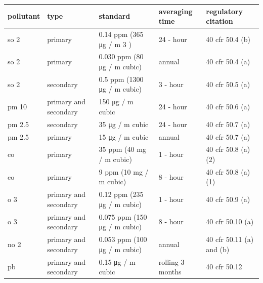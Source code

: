 \documentclass{article}
\begin{document}
\begin{tabular}{lllll}
\toprule
pollutant & type & standard & averaging time & regulatory citation \\
\midrule
so 2 & primary & 0.14 ppm (365 μg / m 3 ) & 24 - hour & 40 cfr 50.4 (b) \\
so 2 & primary & 0.030 ppm (80 μg / m cubic) & annual & 40 cfr 50.4 (a) \\
so 2 & secondary & 0.5 ppm (1300 μg / m cubic) & 3 - hour & 40 cfr 50.5 (a) \\
pm 10 & primary and secondary & 150 μg / m cubic & 24 - hour & 40 cfr 50.6 (a) \\
pm 2.5 & secondary & 35 μg / m cubic & 24 - hour & 40 cfr 50.7 (a) \\
pm 2.5 & primary & 15 μg / m cubic & annual & 40 cfr 50.7 (a) \\
co & primary & 35 ppm (40 mg / m cubic) & 1 - hour & 40 cfr 50.8 (a) (2) \\
co & primary & 9 ppm (10 mg / m cubic) & 8 - hour & 40 cfr 50.8 (a) (1) \\
o 3 & primary and secondary & 0.12 ppm (235 μg / m cubic) & 1 - hour & 40 cfr 50.9 (a) \\
o 3 & primary and secondary & 0.075 ppm (150 μg / m cubic) & 8 - hour & 40 cfr 50.10 (a) \\
no 2 & primary and secondary & 0.053 ppm (100 μg / m cubic) & annual & 40 cfr 50.11 (a) and (b) \\
pb & primary and secondary & 0.15 μg / m cubic & rolling 3 months & 40 cfr 50.12 \\
\bottomrule
\end{tabular}
\end{document}

